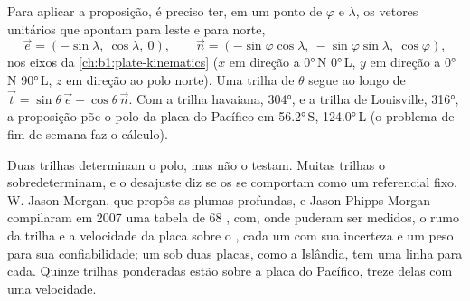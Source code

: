 Para aplicar a proposição, é preciso ter, em um ponto de  $\varphi$ e  $\lambda$, os vetores unitários que apontam para leste e para norte,
\[
  \vec e = (-\sin\lambda,\ \cos\lambda,\ 0),\qquad
  \vec n = (-\sin\varphi\cos\lambda,\ -\sin\varphi\sin\lambda,\ \cos\varphi),
\]
nos eixos da \cref{ch:b1:plate-kinematics} ($x$ em direção a \ang{0}\,N
\ang{0}\,L, $y$ em direção a \ang{0}\,N \ang{90}\,L, $z$ em direção ao polo norte). Uma
trilha de  $\theta$ segue ao longo de $\vec t = \sin\theta\,\vec e +
\cos\theta\,\vec n$. Com a trilha havaiana,  \ang{304}, e a trilha de Louisville,  \ang{316}, a proposição põe o polo da placa do Pacífico em \ang{56.2}\,S, \ang{124.0}\,L (o problema de fim de semana faz o cálculo).

Duas trilhas determinam o polo, mas não o testam. Muitas trilhas o sobredeterminam, e o desajuste diz se os  se comportam como um referencial fixo. W. Jason Morgan, que propôs as plumas profundas, e Jason Phipps Morgan compilaram em 2007 uma tabela de 68 , com, onde puderam ser medidos, o rumo da trilha e a velocidade da placa sobre o , cada um com sua incerteza e um peso para sua confiabilidade; um  sob duas placas, como a Islândia, tem uma linha para cada. Quinze trilhas ponderadas estão sobre a placa do Pacífico, treze delas com uma velocidade.

